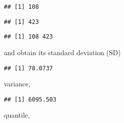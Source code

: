 \documentclass[]{book}
\newenvironment{Shaded}{\begin{snugshade}}{\end{snugshade}}
\newcommand{\KeywordTok}[1]{\textcolor[rgb]{0.13,0.29,0.53}{\textbf{#1}}}
\newcommand{\OperatorTok}[1]{\textcolor[rgb]{0.81,0.36,0.00}{\textbf{#1}}}
\newcommand{\NormalTok}[1]{#1}
\theoremstyle{definition}
\theoremstyle{definition}
\theoremstyle{remark}
\begin{document}
\begin{verbatim}
## [1] 108
\end{verbatim}

\begin{Shaded}
\end{Shaded}

\begin{verbatim}
## [1] 423
\end{verbatim}

\begin{Shaded}
\end{Shaded}

\begin{verbatim}
## [1] 108 423
\end{verbatim}

and obtain its standard deviation (SD)

\begin{Shaded}
\end{Shaded}

\begin{verbatim}
## [1] 78.0737
\end{verbatim}

variance,

\begin{Shaded}
\end{Shaded}

\begin{verbatim}
## [1] 6095.503
\end{verbatim}

quantile,

\begin{Shaded}
\end{Shaded}
\end{document}
